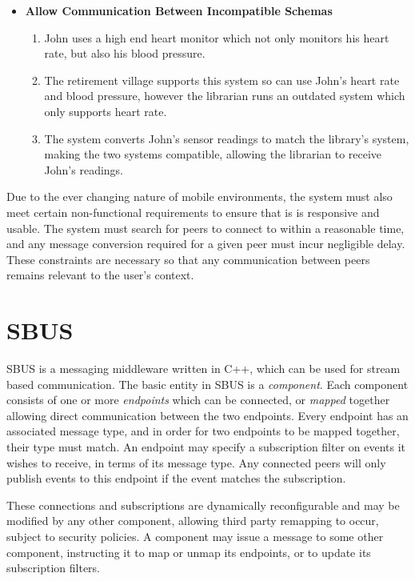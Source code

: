 \documentclass[12pt,twoside,notitlepage]{report}
\begin{document}
\begin{itemize}
\item {\bf Allow Communication Between Incompatible Schemas}

\begin{enumerate}

\item John uses a high end heart monitor which not only monitors his heart rate, but also his blood pressure.

\item The retirement village supports this system so can use John's heart rate and blood pressure, however the librarian runs an outdated system which only supports heart rate.

\item The system converts John's sensor readings to match the library's system, making the two systems compatible, allowing the librarian to receive John's readings.

\end{enumerate}

\end{itemize}

Due to the ever changing nature of mobile environments, the system must also meet certain non-functional requirements to ensure that is is responsive and usable. 
The system must search for peers to connect to within a reasonable time, and any message conversion required for a given peer must incur negligible delay.
These constraints are necessary so that any communication between peers remains relevant to the user's context.

\section{SBUS}

SBUS \cite{ingram2009reconfigurable} is a messaging middleware written in C++, which can be used for stream based communication. 
The basic entity in SBUS is a {\sl component}. 
Each component consists of one or more {\sl endpoints} which can be connected, or {\sl mapped} together allowing direct communication between the two endpoints. 
Every endpoint has an associated message type, and in order for two endpoints to be mapped together, their type must match. 
An endpoint may specify a subscription filter on events it wishes to receive, in terms of its message type.
 Any connected peers will only publish events to this endpoint if the event matches the subscription.

These connections and subscriptions are dynamically reconfigurable and may be modified by any other component, allowing third party remapping to occur, subject to security policies. 
A component may issue a message to some other component, instructing it to map or unmap its endpoints, or to update its subscription filters.
\end{document}
